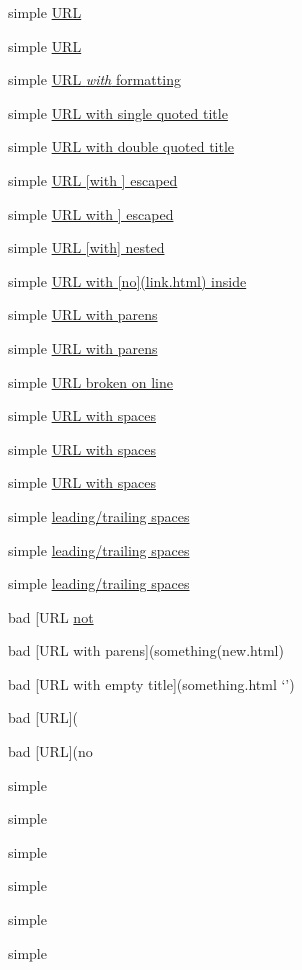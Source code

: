 simple \href{}{URL}

simple \href{something.html}{URL}

simple \href{something.html}{URL \emph{with} formatting}

simple \href{something.html}{URL with single quoted title}

simple \href{something.html}{URL with double quoted title}

simple \href{something.html}{URL [with ] escaped}

simple \href{something.html}{URL with ] escaped}

simple \href{something.html}{URL [with] nested}

simple \href{something.html}{URL with [no](link.html) inside}

simple \href{/something/to(do)}{URL with parens}

simple \href{/something/to(do}{URL with parens}

simple \href{something.html}{URL broken
on line}

simple \href{with spaces.html}{URL with spaces}

simple \href{with spaces.html}{URL with spaces}

simple \href{with (spaces).html}{URL with spaces}

simple \href{spaces.html}{leading/trailing spaces}

simple \href{spaces.html}{leading/trailing spaces}

simple \href{spaces.html}{leading/trailing spaces}

bad [URL \href{something.html}{not}

bad [URL with parens](something(new.html)

bad [URL with empty title](something.html `{}')

bad [URL](

bad [URL](no

simple 

simple 

simple 

simple 

simple 

simple 

